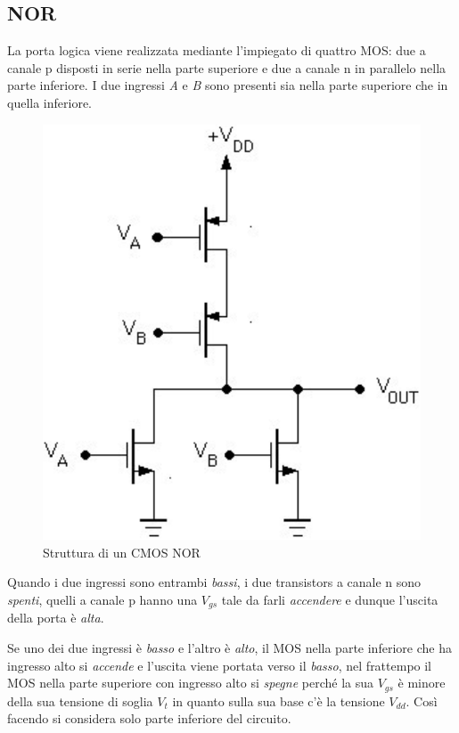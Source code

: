 \documentclass[12pt, a4paper]{report}
\begin{document}
\subsection{NOR}
La porta logica viene realizzata mediante l'impiegato di quattro MOS: due a canale p disposti in serie nella parte superiore e due a canale n in parallelo nella parte inferiore. I due ingressi \textit{A} e \textit{B} sono presenti sia nella parte superiore che in quella inferiore.
\begin{figure}[h]
    \centering
    \includegraphics[scale=0.4,angle=0]{cmos_nor.png}
    \caption{Struttura di un CMOS NOR}
\end{figure}

Quando i due ingressi sono entrambi \textit{bassi}, i due transistors a canale n sono  \textit{spenti}, quelli a canale p hanno una $V_{gs}$ tale da farli \textit{accendere} e dunque l'uscita della porta è \textit{alta}.

Se uno dei due ingressi è \textit{basso} e l'altro è \textit{alto}, il MOS nella parte inferiore che ha ingresso alto si \textit{accende} e l'uscita viene portata verso il \textit{basso}, nel frattempo il MOS nella parte superiore con ingresso alto si \textit{spegne} perché la sua $V_{gs}$ è minore della sua tensione di soglia $V_t$ in quanto sulla sua base c'è la tensione $V_{dd}$. Così facendo si considera solo parte inferiore del circuito.
\end{document}
